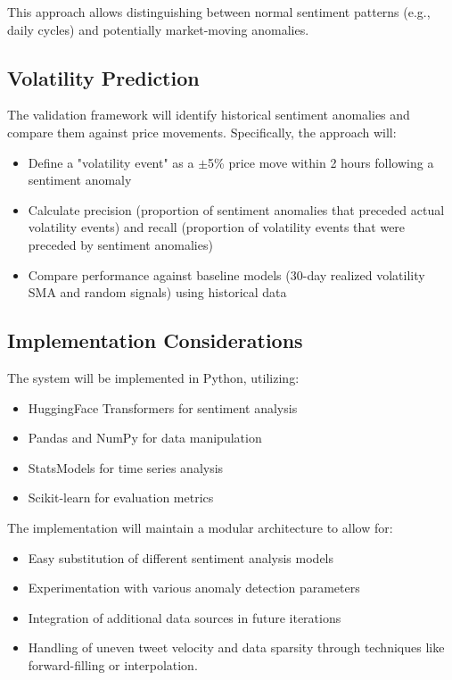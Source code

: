 \documentclass[11pt,twocolumn]{article}
\begin{document}
This approach allows distinguishing between normal sentiment patterns (e.g., daily cycles) and potentially market-moving anomalies.

\subsection{\textbf{Volatility Prediction}}
The validation framework will identify historical sentiment anomalies and compare them against price movements. Specifically, the approach will:
\begin{itemize}
\item Define a "volatility event" as a $\pm$5\% price move within 2 hours following a sentiment anomaly
\item Calculate precision (proportion of sentiment anomalies that preceded actual volatility events) and recall (proportion of volatility events that were preceded by sentiment anomalies)
\item Compare performance against baseline models (30-day realized volatility SMA and random signals) using historical data
\end{itemize}

\subsection{\textbf{Implementation Considerations}}
The system will be implemented in Python, utilizing:
\begin{itemize}
\item HuggingFace Transformers for sentiment analysis
\item Pandas and NumPy for data manipulation
\item StatsModels for time series analysis
\item Scikit-learn for evaluation metrics
\end{itemize}

The implementation will maintain a modular architecture to allow for:
\begin{itemize}
\item Easy substitution of different sentiment analysis models
\item Experimentation with various anomaly detection parameters
\item Integration of additional data sources in future iterations
\item Handling of uneven tweet velocity and data sparsity through techniques like forward-filling or interpolation.
\end{itemize}
\end{document}
